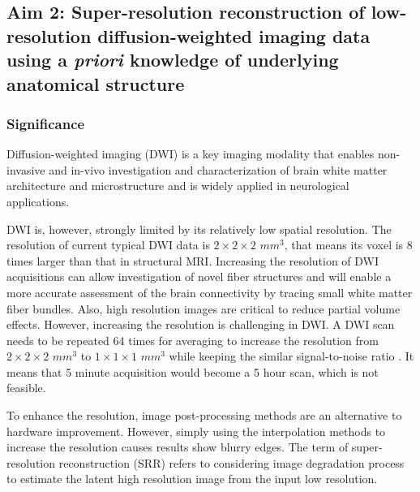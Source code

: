 \subsection{Aim 2: Super-resolution reconstruction of low-resolution diffusion-weighted imaging data using a \emph{priori} knowledge of underlying anatomical structure}
\label{subsection:Aim2ResearchDesign}

\subsubsection{Significance}

Diffusion-weighted imaging (DWI) is a key imaging modality that enables non-invasive and in-vivo investigation and characterization of brain white matter architecture and microstructure and is widely applied in neurological applications.

DWI is, however, strongly limited by its relatively low spatial resolution. The resolution of current typical DWI data is $2 \times 2 \times 2$  $mm^3$, that means its voxel is $8$ times larger than that in structural MRI. 
Increasing the resolution of DWI acquisitions can allow investigation of novel fiber structures and will enable a more accurate assessment of the brain connectivity by tracing small white matter fiber bundles. Also, high resolution images are critical to reduce partial volume effects. 
However, increasing the resolution is challenging in DWI. A DWI scan needs to be repeated 64 times for averaging to increase the resolution from $2 \times 2 \times 2$ $mm^3$ to $1 \times 1 \times 1$ $mm^3$ while keeping the similar signal-to-noise ratio \cite{brown2014}. It means that 5 minute acquisition would become a 5 hour scan, which is not feasible. 

To enhance the resolution, image post-processing methods are an alternative to hardware improvement.
However, simply using the interpolation methods to increase the resolution causes results show blurry edges.
The term of super-resolution reconstruction (SRR) refers to considering image degradation process to estimate the latent high resolution image from the input low resolution.

